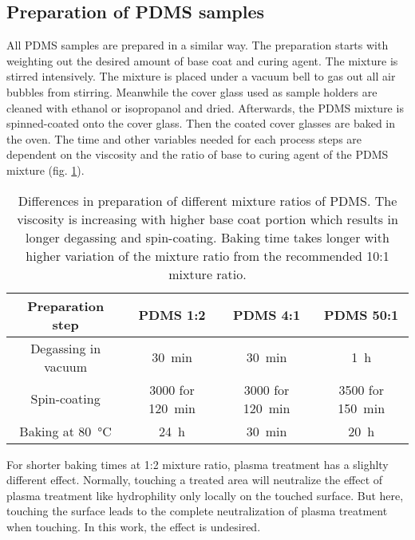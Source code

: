 \subsection{Preparation of PDMS samples}

All PDMS samples are prepared in a similar way. The preparation starts with weighting out the desired amount of base coat and curing agent. The mixture is stirred intensively. The mixture is placed under a vacuum bell to gas out all air bubbles from stirring. Meanwhile the cover glass used as sample holders are cleaned with ethanol or isopropanol and dried. Afterwards, the PDMS mixture is spinned-coated onto the cover glass. Then the coated cover glasses are baked in the oven. The time and other variables needed for each process steps are dependent on the viscosity and the ratio of base to curing agent of the PDMS mixture (fig. \ref{table:preparationPDMSmixturereatios}). 

\begin{table}
	\centering
	\begin{tabular}{|c|c|c|c|}
		\hline
		 Preparation step & PDMS 1:2 & PDMS 4:1 & PDMS 50:1 \\
		\hline
		\hline
		Degassing in vacuum & \SI{30}{\minute} & \SI{30}{\minute} & \SI{1}{\hour}\\
		\hline
		Spin-coating & \SI{3000}{\rpm} for \SI{120}{\minute}  & \SI{3000}{\rpm} for \SI{120}{\minute} & \SI{3500}{\rpm} for \SI{150}{\minute} \\
		\hline
		Baking at \SI{80}{\degreeCelsius} & \SI{24}{\hour} & \SI{30}{\minute} & \SI{20}{\hour}\\
		\hline	
	\end{tabular}
	\caption{Differences in preparation of different mixture ratios of PDMS. The viscosity is increasing with higher base coat portion which results in longer degassing and spin-coating. Baking time takes longer with higher variation of the mixture ratio from the recommended 10:1 mixture ratio.}
	\label{table:preparationPDMSmixturereatios}
\end{table}


For shorter baking times at 1:2 mixture ratio, plasma treatment has a slighlty different effect. Normally, touching a treated area will neutralize the effect of plasma treatment like hydrophility only locally on the touched surface. But here, touching the surface leads to the complete neutralization of plasma treatment when touching. In this work, the effect is undesired.

